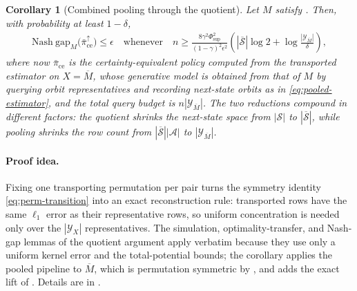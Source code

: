 \documentclass{article}
\theoremstyle{plain}
\newtheorem{corollary}[theorem]{Corollary}
\theoremstyle{definition}
\theoremstyle{remark}
\newcommand{\Nash}{\mathrm{Nash\ gap}}
\newcommand{\St}{\mathcal{S}}
\newcommand{\Ac}{\mathcal{A}}
\newcommand{\abs}[1]{\left\lvert#1\right\rvert}
\newcommand{\quotient}[1]{\overline{#1}}
\newcommand{\Phisup}{\Phi_{\mathrm{sup}}}
\newcommand{\pice}{\bar\pi_{\mathrm{ce}}}
\begin{document}
\begin{corollary}[Combined pooling through the quotient]
\label{cor:combined-sample}
Let $M$ satisfy
. Then, with
probability at least $1-\delta$,
\begin{align*}
  \Nash_M\big(\pice^\uparrow\big)
  \le
  \epsilon
  \quad\text{whenever}\quad
  n
  \ge
  \frac{8\gamma^2\Phisup^2}{(1-\gamma)^2\epsilon^2}
  \left(
    \abs{\quotient\St}\log 2
    +
    \log\frac{\abs{\mathcal Y_{\quotient M}}}{\delta}
  \right),
\end{align*}
where now $\pice$ is the certainty-equivalent policy computed from the
transported estimator on $X=\quotient M$, whose generative model is obtained
from that of $M$ by querying orbit representatives and recording next-state
orbits as in \eqref{eq:pooled-estimator}, and the total query budget is
$n\abs{\mathcal Y_{\quotient M}}$. The two reductions compound in different
factors: the quotient shrinks the next-state space from $\abs\St$ to
$\abs{\quotient\St}$, while pooling shrinks the row count from
$\abs{\quotient\St}\abs\Ac$ to $\abs{\mathcal Y_{\quotient M}}$.
\end{corollary}

\paragraph{Proof idea.}
Fixing one transporting permutation per pair turns the symmetry identity
\eqref{eq:perm-transition} into an exact reconstruction rule: transported rows
have the same $\ell_1$ error as their representative rows, so uniform
concentration is needed only over the $\abs{\mathcal Y_X}$ representatives.
The simulation, optimality-transfer, and Nash-gap lemmas of the quotient
argument apply verbatim because they use only a uniform kernel error and the
total-potential bounds; the corollary applies the pooled pipeline to
$\quotient M$, which is permutation symmetric by
, and adds the exact lift of
. Details are in
.
\end{document}
